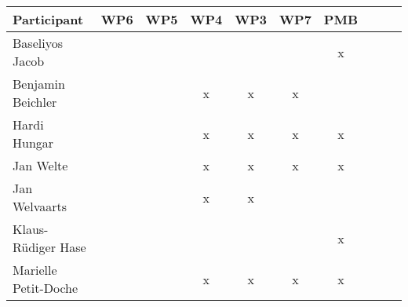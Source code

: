 \documentclass[a4paper, 11pt]{article}
\begin{document}
\begin{tabular}{|l|c|c|c||c|c|c||c|c|c|}
\hline
\textbf{Participant} & \textbf{WP6} &  \textbf{WP5} & \textbf{WP4}&  \textbf{WP3} & \textbf{WP7}&  \textbf{PMB} \\\hline
Baseliyos Jacob      &   &   &   &  &  & x \\\hline 
Benjamin Beichler    &  &   & x & x & x &  \\\hline
Hardi Hungar         &   &   & x &  x & x  & x  \\\hline
Jan Welte            &   &  & x & x & x & x \\\hline
Jan Welvaarts        &  &  & x & x  & &   \\\hline
Klaus-R\"udiger Hase &  &   &  &  &  & x \\\hline
Marielle Petit-Doche &   &  & x & x & x & x \\\hline

\end{tabular}
\end{document}
